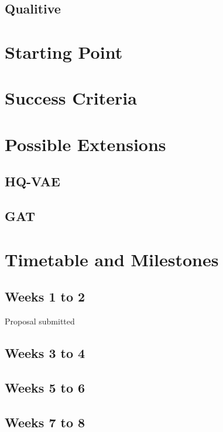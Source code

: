 \documentclass[20pt]{article}
\begin{document}
\subsection*{Qualitive}



\section{Starting Point}





\section{Success Criteria}




\section{Possible Extensions}

\subsection{HQ-VAE}

\subsection{GAT}

\section{Timetable and Milestones}

\subsection*{Weeks 1 to 2}
Proposal submitted

\subsection*{Weeks 3 to 4}

\subsection*{Weeks 5 to 6}

\subsection*{Weeks 7 to 8}
\end{document}
